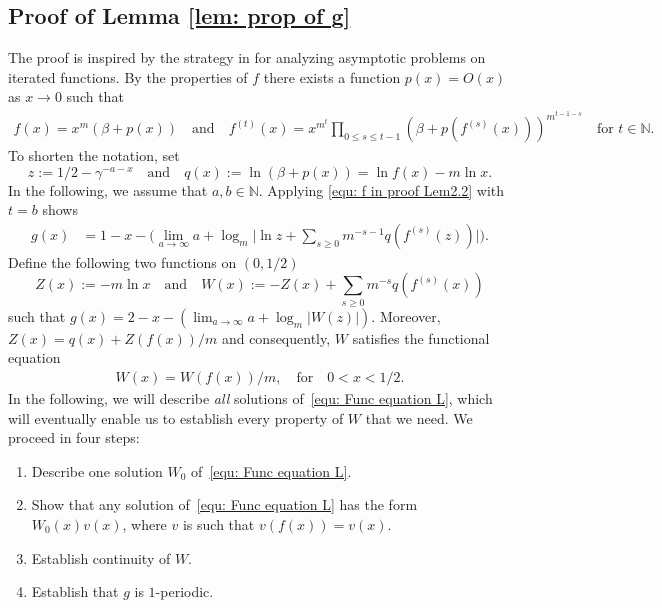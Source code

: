 \documentclass[11pt]{article}
\numberwithin{theorem}{section}
\begin{document}
\subsection{Proof of Lemma \ref{lem: prop of g}}\label{sec: proof of prop of g} 
The proof is inspired by the strategy in \cite{debruijn} for analyzing asymptotic problems on iterated functions.
By the properties of $f$ there exists a function $p(x) = O(x)$ as $x\to 0$ such that
\begin{align}\label{equ: f in proof Lem2.2}
f(x) = x^m (\beta +p(x)) \quad \text{and}\quad f^{(t)}(x)=x^{m^t} \prod_{0\leq s \leq t-1} \left(\beta+ p(f^{(s)}(x)) \right)^{m^{t-1-s}}
\quad\text{for } t\in \mathbb{N}.
\end{align}
To shorten the notation, set
\[
z:= 1/2 -\gamma^{-a-x} \quad \text{and}\quad q(x) := \ln(\beta+p(x)) = \ln f(x) - m\ln x.
\]
In the following, we assume that $a,b\in \mathbb{N}$. Applying \eqref{equ: f in proof Lem2.2} with $t=b$ shows
\begin{align*}\label{equ: fct g in proof Lem2.2}
g(x) 
&= 1-x-\Big(\lim_{a\to \infty} a +\log_m\Big| \ln z + \sum_{s\geq 0}m^{-s-1}q(f^{(s)}(z))\Big|\Big).
\end{align*} 
Define the following two functions on $(0,1/2)$
\[
Z(x):= -m \ln x  \quad 
\text{and} \quad
W(x) := -Z(x)+\sum_{s\geq 0} m^{-s}q(f^{(s)}(x))
\]
such that $g(x) = 2-x-(\lim_{a\to\infty}a+\log_m\left|W(z) \right|)$.
Moreover,  $Z(x) = q(x)+Z(f(x))/m$
and consequently, $W$ satisfies the functional equation
\begin{align}\label{equ: Func equation L}
    W(x)=W(f(x))/m,
    \quad\text{for}\quad 0<x<1/2.
\end{align}
In the following, we will describe \emph{all} solutions of~\eqref{equ: Func equation L}, which will eventually enable us to establish every property of $W$ that we need.
We proceed in four steps:
\begin{enumerate}
\itemsep0em 
    \item\label{step1} Describe one solution $W_0$ of~\eqref{equ: Func equation L}.
    \item\label{step2} Show that any solution of~\eqref{equ: Func equation L} has the form $W_0(x)v(x)$, where $v$ is such that $v(f(x))=v(x)$.
    \item\label{step3} Establish continuity of $W$.
    \item\label{step4} Establish that $g$ is $1$-periodic.
\end{enumerate}
\end{document}
